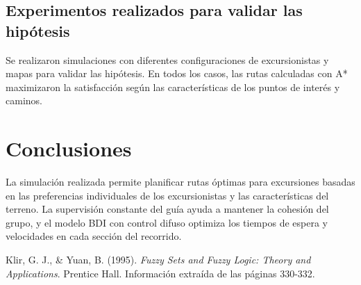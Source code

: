 \documentclass[10pt,twocolumn]{article}
\begin{document}
	\subsection{Experimentos realizados para validar las hipótesis}
	Se realizaron simulaciones con diferentes configuraciones de excursionistas y mapas para validar las hipótesis. En todos los casos, las rutas calculadas con A* maximizaron la satisfacción según las características de los puntos de interés y caminos.
	
	\section{Conclusiones}
	La simulación realizada permite planificar rutas óptimas para excursiones basadas en las preferencias individuales de los excursionistas y las características del terreno. La supervisión constante del guía ayuda a mantener la cohesión del grupo, y el modelo BDI con control difuso optimiza los tiempos de espera y velocidades en cada sección del recorrido.
	
	\begin{thebibliography}{9}
		
		 Klir, G. J., \& Yuan, B. (1995). \textit{Fuzzy Sets and Fuzzy Logic: Theory and Applications}. Prentice Hall. Información extraída de las páginas 330-332.
		
	\end{thebibliography}
	
	
\end{document}
